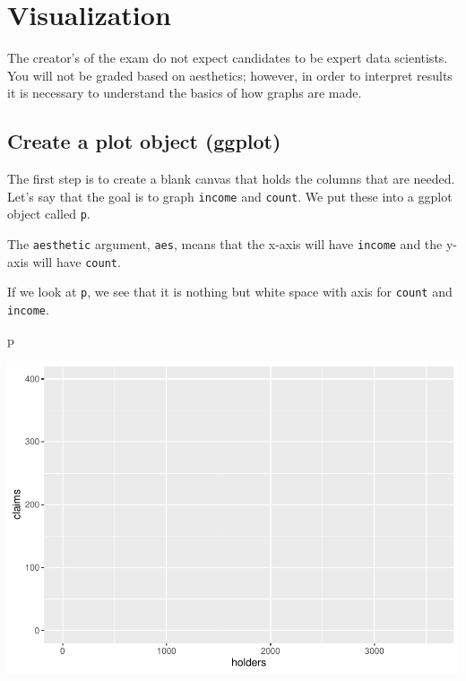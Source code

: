 \documentclass[]{book}
\newenvironment{Shaded}{\begin{snugshade}}{\end{snugshade}}
\newcommand{\DataTypeTok}[1]{\textcolor[rgb]{0.13,0.29,0.53}{#1}}
\newcommand{\KeywordTok}[1]{\textcolor[rgb]{0.13,0.29,0.53}{\textbf{#1}}}
\newcommand{\NormalTok}[1]{#1}
\newcommand{\OperatorTok}[1]{\textcolor[rgb]{0.81,0.36,0.00}{\textbf{#1}}}
\newcommand{\StringTok}[1]{\textcolor[rgb]{0.31,0.60,0.02}{#1}}
\begin{document}
\hypertarget{visualization}{%
\chapter{Visualization}\label{visualization}}

The creator's of the exam do not expect candidates to be expert data scientists. You will not be graded based on aesthetics; however, in order to interpret results it is necessary to understand the basics of how graphs are made.

\hypertarget{create-a-plot-object-ggplot}{%
\section{Create a plot object (ggplot)}\label{create-a-plot-object-ggplot}}

The first step is to create a blank canvas that holds the columns that are needed. Let's say that the goal is to graph \texttt{income} and \texttt{count}. We put these into a ggplot object called \texttt{p}.

The \texttt{aesthetic} argument, \texttt{aes}, means that the x-axis will have \texttt{income} and the y-axis will have \texttt{count}.

\begin{Shaded}
\end{Shaded}

If we look at \texttt{p}, we see that it is nothing but white space with axis for \texttt{count} and \texttt{income}.

\begin{Shaded}
\begin{Highlighting}[]
\NormalTok{p}
\end{Highlighting}
\end{Shaded}

\includegraphics{Exam-PA-Study-Manual_files/figure-latex/unnamed-chunk-71-1.pdf}
\end{document}
